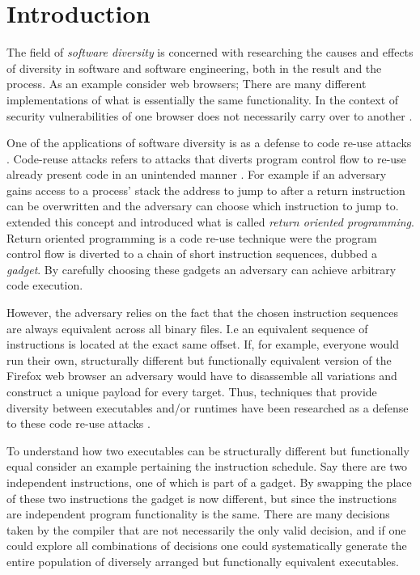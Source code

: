 \chapter{Introduction}

The field of \textit{software diversity} is concerned with researching the
causes and effects of diversity in software and software engineering, both in the result
and the process. As an example consider web browsers; There are many different implementations
of what is essentially the same functionality. In the context of security vulnerabilities
of one browser does not necessarily carry over to another \cite{survey}.

One of the applications of software diversity is as a defense to code re-use attacks \cite{survey}.
Code-reuse attacks refers to attacks that diverts program control flow to re-use already
present code in an unintended manner \cite{code-re-use}. For example if an adversary gains
access to a process' stack the address to jump to after a return instruction can be
overwritten and the adversary can choose which instruction to jump to. \textcite{rop}
extended this concept and introduced what is called \textit{return oriented programming}.
Return oriented programming is a code re-use technique were the program control flow is
diverted to a chain of short instruction sequences, dubbed a \textit{gadget}. By carefully
choosing these gadgets an adversary can achieve arbitrary code execution.

However, the adversary relies on the fact that the chosen instruction sequences are always
equivalent across all binary files. I.e an equivalent sequence of instructions is located
at the exact same offset. If, for example, everyone would run their own, structurally
different but functionally equivalent version of the Firefox web browser an adversary would
have to disassemble all variations and construct a unique payload for every target. Thus,
techniques that provide diversity between executables and/or runtimes have been researched
as a defense to these code re-use attacks \cite{survey}.

To understand how two executables can be structurally different but functionally equal
consider an example pertaining the instruction schedule. Say there are two independent
instructions, one of which is part of a gadget. By swapping the place of these two
instructions the gadget is now different, but since the instructions are independent
program functionality is the same. There are many decisions taken by the compiler that are
not necessarily the only valid decision, and if one could explore all combinations of
decisions one could systematically generate the entire population of diversely arranged
but functionally equivalent executables.

